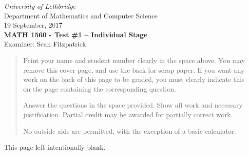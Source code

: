 \documentclass[12pt]{article}
\newcommand{\skipline}{\vspace{12pt}}
\begin{document}
\author{Instructor: Sean Fitzpatrick}
\thispagestyle{plain}
\begin{center}
\emph{University of Lethbridge}\\
Department of Mathematics and Computer Science\\
19 September, 2017\\
{\bf MATH 1560 - Test \#1 -- Individual Stage}\\
Examiner: Sean Fitzpatrick
\end{center}



\vspace{0.1in}

\vspace*{\fill}

\begin{quote}
Print your name and student number clearly in the space above. You may remove this cover page, and use the back for scrap paper. If you want any work on the back of this page to be graded, you must clearly indicate this on the page containing the corresponding question.

\medskip

Answer the questions in the space provided. Show all work and necessary justification. Partial credit may be awarded for partially correct work.
 
\medskip

No outside aids are permitted, with the exception of a basic calculator. 
\end{quote}



\newpage
\thispagestyle{empty}

This page left intentionally blank.

\newpage
\end{document}
